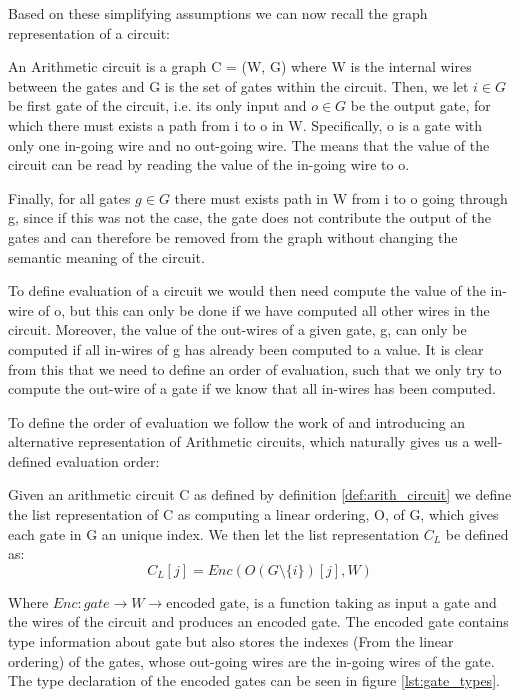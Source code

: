 Based on these simplifying assumptions we can now recall the graph
representation of a circuit:
\begin{definition}
  \label{def:arith_circuit}
  An Arithmetic circuit is a graph C = (W, G) where W is the internal
  wires between the gates and G is the set of gates within the circuit. Then,
  we let $i \in G$ be first gate of the circuit, i.e. its only input and $o \in G$ be the output
  gate, for which there must exists a path from i to o in W.
  Specifically, o is a gate with only one in-going wire and no out-going wire.
  The means that the value of the circuit can be read by reading the value of
  the in-going wire to o.


  Finally, for all gates $g \in G$ there must exists path in W from i to o going
  through g,
  since if this was not the case, the gate does not contribute the output of the
  gates and can therefore be removed from the graph without changing the
  semantic meaning of the circuit.
\end{definition}

To define evaluation of a circuit we would then need compute the value of the
in-wire of o, but this can only be done if we have computed all other wires in
the circuit. Moreover, the value of the out-wires of a given gate, g, can only
be computed if all in-wires of g has already been computed to a value. It is
clear from this that we need to define an order of evaluation, such that we only
try to compute the out-wire of a gate if we know that all in-wires has been computed.

To define the order of evaluation we follow the work of \cite{Yao} and introducing an alternative
representation of Arithmetic circuits, which naturally gives us a well-defined
evaluation order:

\begin{definition}
  Given an arithmetic circuit C as defined by definition \ref{def:arith_circuit}
  we define the list representation of C as computing a linear ordering, O, of
  G, which gives each gate in G an unique index.
  We then let the list representation $C_{L}$ be defined as:
  \[
    C_{L}[j] = Enc(O( G \setminus \{i\})[j], W)
  \]

  Where $Enc : gate \rightarrow W \rightarrow \text{encoded gate}$, is a function
  taking as input a gate and the wires of the circuit and produces an encoded
  gate.
  The encoded gate contains type information about gate but also stores the
  indexes (From the linear ordering) of the gates, whose out-going wires are the
  in-going wires of the gate.
  The type declaration of the encoded gates can be seen in figure \ref{lst:gate_types}.
\end{definition}

